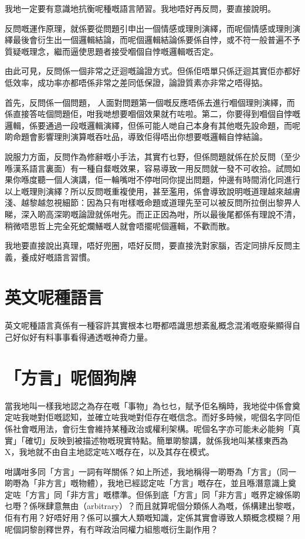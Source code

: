 \documentclass[a5paper, 10pt, openany]{book} %
\begin{document}
我地一定要有意識地抗衡呢種嘅語言陋習。我地唔好再反問，要直接說明。

反問嘅運作原理，就係要從問題引申出一個情感或理則演繹，而呢個情感或理則演繹最後會衍生出一個邏輯結論，而呢個邏輯結論係要係自悖，或不符一般普遍不予質疑嘅理念，繼而逼使思題者接受嗰個自悖嘅邏輯嘅否定。

由此可見，反問係一個非常之迂迴嘅論證方式。但係佢唔單只係迂迴其實佢亦都好低效率，成功率亦都唔係非常之差同低保證，論證質素亦非常之唔得掂。

首先，反問係一個問題， 人面對問題第一個嘅反應唔係去進行嗰個理則演繹，而係直接答咗個問題佢，咁我哋想要嗰個效果就冇咗啦。第二，你要得到嗰個自悖嘅邏輯，係要通過一段嘅邏輯演繹，但係可能人哋自己本身有其他嘅先設命題，而呢啲命題會影響理則演算嘅吞吐品，導致佢得唔出你想要嘅邏輯自悖結論。

說服力方面，反問作為修辭嘅小手法，其實冇乜野，但係問題就係在於反問（至少喺漢系語言裏面）有一種自韰嘅效果，容易導致一用反問就一發不可收拾。試問如果你喺度聽一個人演講，佢一輪嘴咁不停咁同你提出問題，仲邊有時間消化同進行以上嘅理則演繹？所以反問嘅重複使用，甚至濫用，係會導致說明嘅道理越來越膚淺、越黎越忽視細節：因為只有咁樣嘅命題或道理先至可以被反問所拉倒出黎畀人睇，深入啲高深啲嘅論證就係咁先。而正正因為咁，所以最後尾都係有理說不清，稍微唔思哲上完全死蛇爛鱔嘅人就會唔擺呢個邏輯，不歡而散。

我地要直接說出真理，唔好兜圈，唔好反問，要直接洗對家腦，否定同排斥反問主義，養成好嘅語言習慣。


\chapter{英文呢種語言}
英文呢種語言真係有一種容許其實根本乜嘢都唔識思想紊亂概念混淆嘅廢柴顯得自己好似好有料事事看得通透嘅神奇力量。

\chapter{「方言」呢個狗牌}
當我地叫一樣我地認之為存在嘅「事物」為乜乜，賦予佢名稱時，我地從中係會奠定咗我哋對佢嘅認知，並確立咗我哋對佢存在嘅信念。而好多時候，呢個名字同佢係社會嘅用法，會衍生會維持某種政治或權利架構。呢個名字亦可能未必能夠「真實」「確切」反映到被描述物嘅現實特點。簡單啲黎講，就係我地叫某樣東西為X，我地就不由自主地認定咗X嘅存在，以及其存在模式。

咁講咁多同「方言」一詞有咩關係？如上所述，我地稱得一啲嘢為「方言」（同一啲嘢為「非方言」嘅物體），我地已經認定咗「方言」嘅存在，並且喺潛意識上奠定咗「方言」同「非方言」嘅標準。但係到底「方言」同「非方言」嘅界定線係啲乜嘢？係咪肆意無由（arbitrary）？而且就算呢個分類係人為嘅，係構建出黎嘅，佢有冇用？好唔好用？係可以擴大人類嘅知識，定係其實會導致人類概念模糊？用呢個詞黎剖釋世界，有冇咩政治同權力組態嘅衍生副作用？
\end{document}

